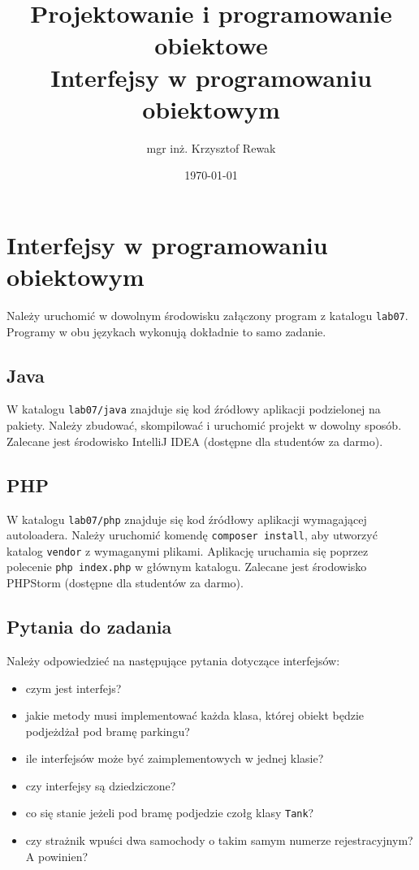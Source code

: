 \documentclass{article}
\title{
	Projektowanie i programowanie obiektowe \\
	\Huge{Interfejsy w programowaniu obiektowym}
}
\author{mgr inż. Krzysztof Rewak}
\date{\today}
\begin{document}
	\maketitle

	\section{Interfejsy w programowaniu obiektowym}
	Należy uruchomić w dowolnym środowisku załączony program z katalogu \texttt{lab07}. Programy w obu językach wykonują dokładnie to samo zadanie.
	
	\subsection{Java}
	W katalogu \texttt{lab07/java} znajduje się kod źródłowy aplikacji podzielonej na pakiety. Należy zbudować, skompilować i uruchomić projekt w dowolny sposób. Zalecane jest środowisko IntelliJ IDEA (dostępne dla studentów za darmo).
	
	\subsection{PHP}
	W katalogu \texttt{lab07/php} znajduje się kod źródłowy aplikacji wymagającej autoloadera. Należy uruchomić komendę \texttt{composer install}, aby utworzyć katalog \texttt{vendor} z wymaganymi plikami. Aplikację uruchamia się poprzez polecenie \texttt{php index.php} w głównym katalogu. Zalecane jest środowisko PHPStorm (dostępne dla studentów za darmo).
	
	\subsection{Pytania do zadania}
	Należy odpowiedzieć na następujące pytania dotyczące interfejsów:
	\begin{itemize}
		\item czym jest interfejs?
		\item jakie metody musi implementować każda klasa, której obiekt będzie podjeżdżał pod bramę parkingu?
		\item ile interfejsów może być zaimplementowych w jednej klasie?
		\item czy interfejsy są dziedziczone?
		\item co się stanie jeżeli pod bramę podjedzie czołg klasy \texttt{Tank}?
		\item czy strażnik wpuści dwa samochody o takim samym numerze rejestracyjnym? A powinien?
	\end{itemize}
	
\end{document}
